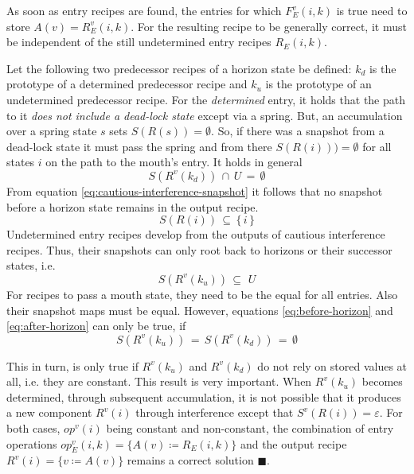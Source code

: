 \documentclass[12pt,a4paper]{scrartcl}
\begin{document}
As soon as entry recipes are found, the entries for which $F_E^v(i,k)$ is true
need to store $A(v)=R_E^v(i,k)$. For the resulting recipe to be generally
correct, it must be independent of the still undetermined entry recipes
$R_E(i,k)$. 

Let the following two predecessor recipes of a horizon state be defined:
$k_d$ is the prototype of a determined predecessor recipe and $k_u$ is the
prototype of an undetermined predecessor recipe. For the \textit{determined}
entry, it holds that the path to it \textit{does not include a dead-lock state}
except via a spring. But, an accumulation over a spring state $s$ sets
$S(R(s))=\emptyset$. So, if there was a snapshot from a dead-lock state it must
pass the spring and from there $S(R(i)))=\emptyset$ for all states $i$ on the
path to the mouth's entry. It holds in general
\begin{equation} \label{eq:before-horizon}
        S(R^v(k_d))\,\cap\,U\,=\,\emptyset
\end{equation}
From equation \eqref{eq:cautious-interference-snapshot} it follows that no
snapshot before a horizon state remains in the output recipe.
\begin{equation}
        S(R(i))\,\subseteq\,\{\,i\,\}
\end{equation}
Undetermined entry recipes develop from the outputs of cautious interference 
recipes. Thus, their snapshots can only root back to horizons or their successor
states, i.e.
\begin{equation} \label{eq:after-horizon}
        S(R^v(k_u))\,\subseteq\,\,U
\end{equation}
For recipes to pass a mouth state, they need to be the equal for all entries. Also
their snapshot maps must be equal. However, equations
\eqref{eq:before-horizon} and \eqref{eq:after-horizon} can only be true, if
\begin{equation} \label{eq:homogeneity-condition}
    S(R^v(k_u))\,=\,S(R^v(k_d))\,=\,\emptyset 
\end{equation}

This in turn, is only true if $R^v(k_u)$ and $R^v(k_d)$ do not rely on stored values
at all, i.e. they are constant. This result is very important. When $R^v(k_u)$
becomes determined, through subsequent accumulation, it is not possible that it
produces a new component $R^v(i)$ through interference except that
$S^v(R(i))=\varepsilon$.  For both cases, $op^v(i)$ being constant and
non-constant, the combination of entry operations $op^v_E(i,k) = \{ A(v) \coloneqq 
R_E(i,k) \}$ and the output recipe $R^v(i)=\{ v\coloneqq A(v) \}$ remains a correct
solution $\blacksquare$.  
\end{document}
